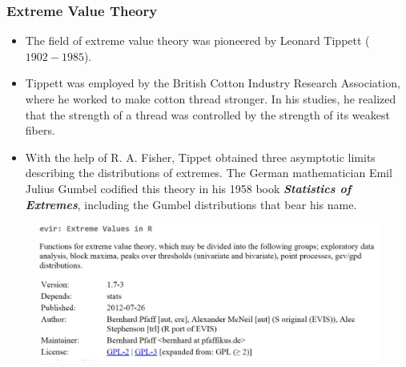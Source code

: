 \documentclass[MAIN.tex]{subfiles}
\begin{document}
\begin{frame}
\frametitle{Extreme Value Theory}

\begin{itemize}
\item The field of extreme value theory was pioneered by Leonard Tippett ($1902-1985$). 
\item Tippett was employed by the British Cotton Industry Research Association, where he worked to make cotton thread stronger. In his studies, he realized that the strength of a thread was controlled by the strength of its weakest fibers.

\item With the help of R. A. Fisher, Tippet obtained three asymptotic limits describing the distributions of extremes. The German mathematician Emil Julius Gumbel codified this theory in his 1958 book \textbf{\emph{Statistics of Extremes}}, including the Gumbel distributions that bear his name.
\end{itemize}
\end{frame}
\begin{frame}
\begin{figure}
\centering
\includegraphics[width=1.05\linewidth]{images/evir}

\end{figure}

\end{frame}
\end{document}
